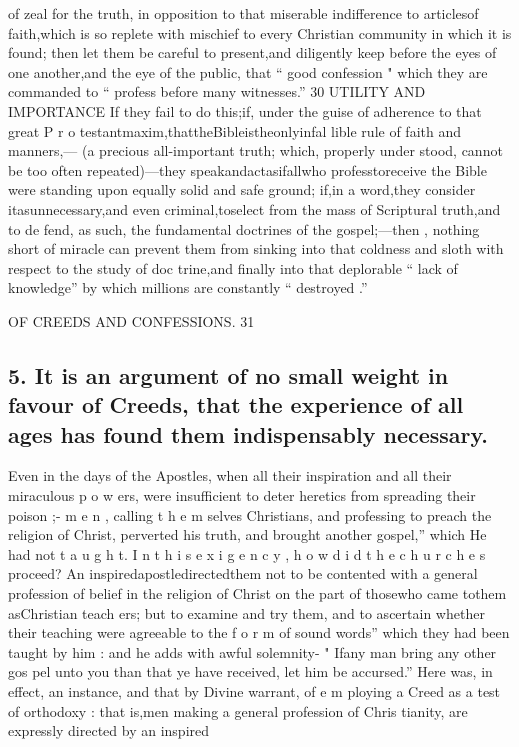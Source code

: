 \documentclass[
]{book}
\begin{document}
of zeal for the truth, in opposition to that miserable indifference to articlesof faith,which is so replete with mischief to every Christian community in which it is found; then let them be careful to present,and diligently keep before the eyes of one another,and the eye of the public, that `` good confession "
which they are commanded to `` profess before many witnesses.''
30 UTILITY AND IMPORTANCE
If they fail to do this;if,
under the guise of adherence to that great P r o testantmaxim,thattheBibleistheonlyinfal lible rule of faith and manners,--- (a precious all-important truth; which, properly under stood, cannot be too often repeated)---they speakandactasifallwho professtoreceive the Bible were standing upon equally solid and safe ground; if,in a word,they consider itasunnecessary,and even criminal,toselect from the mass of Scriptural truth,and to de fend, as such, the fundamental doctrines of the gospel;---then , nothing short of miracle can prevent them from sinking into that coldness and sloth with respect to the study of doc
trine,and finally into that deplorable `` lack of
knowledge'' by which millions are constantly `` destroyed .''

OF CREEDS AND CONFESSIONS. 31

\hypertarget{it-is-an-argument-of-no-small-weight-in-favour-of-creeds-that-the-experience-of-all-ages-has-found-them-indispensably-necessary.}{%
\subsection{5. It is an argument of no small weight in favour of Creeds, that the experience of all ages has found them indispensably necessary.}\label{it-is-an-argument-of-no-small-weight-in-favour-of-creeds-that-the-experience-of-all-ages-has-found-them-indispensably-necessary.}}

Even in the days of the Apostles, when all
their inspiration and all their miraculous p o w ers, were insufficient to deter heretics from
spreading their poison ;- m e n , calling t h e m selves Christians, and professing to preach the
religion of Christ, perverted his truth, and brought another gospel,'' which He had not t a u g h t. I n t h i s e x i g e n c y , h o w d i d t h e c h u r c h e s proceed? An inspiredapostledirectedthem not to be contented with a general profession of belief in the religion of Christ on the part of thosewho came tothem asChristian teach ers; but to examine and try them, and to ascertain whether their teaching were agreeable to the f o r m of sound words'' which they had
been taught by him : and he adds with awful solemnity- " Ifany man bring any other gos pel unto you than that ye have received, let him be accursed.'' Here was, in effect, an
instance, and that by Divine warrant, of e m
ploying a Creed as a test of orthodoxy : that is,men making a general profession of Chris
tianity, are expressly directed by an inspired
\end{document}
